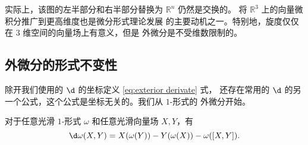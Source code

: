 \begin{remark}
  实际上，该图的左半部分和右半部分替换为 $\mathbb{R}^n$ 仍然是交换的。
  将 $\mathbb{R}^3$ 上的向量微积分推广到更高维度也是微分形式理论发展
  的主要动机之一。特别地，旋度仅仅在 $3$ 维空间的向量场上有意义，但是
  外微分是不受维数限制的。
\end{remark}

\subsection{外微分的形式不变性}

除开我们使用的 $\d$ 的坐标定义 \eqref{eq:exterior derivate} 式，
还存在常用的 $\d$ 的另一个公式，这个公式是坐标无关的。我们从 $1$-形式的
外微分开始。

\begin{proposition}[$1$-形式的外微分]
  对于任意光滑 $1$-形式 $\omega$ 和任意光滑向量场 $X,Y$，有
  \begin{equation}
    \d\omega(X,Y)=X(\omega(Y))-Y(\omega(X))-\omega([X,Y]).
  \end{equation}
\end{proposition}




